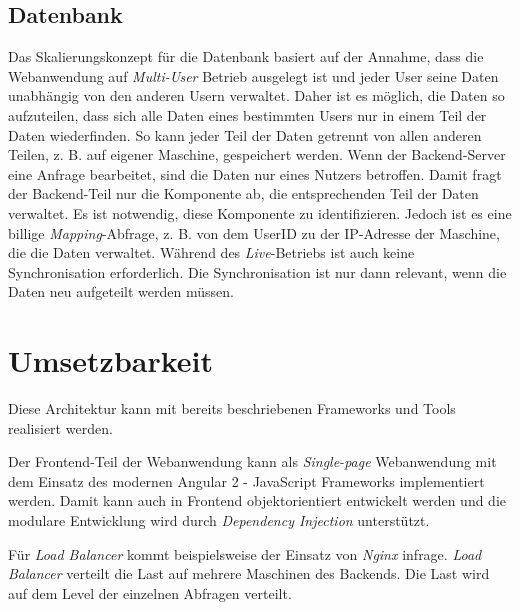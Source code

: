 \subsection{Datenbank}

Das Skalierungskonzept für die Datenbank basiert auf der Annahme, dass die Webanwendung auf \textit{Multi-User} Betrieb ausgelegt ist und jeder User seine Daten unabhängig von den anderen Usern verwaltet. Daher ist es möglich, die Daten so aufzuteilen, dass sich alle Daten eines bestimmten Users nur in einem Teil der Daten wiederfinden. So kann jeder Teil der Daten getrennt von allen anderen Teilen, z. B. auf eigener Maschine, gespeichert werden. Wenn der Backend-Server eine Anfrage bearbeitet, sind die Daten nur eines Nutzers betroffen. Damit fragt der Backend-Teil nur die Komponente ab, die entsprechenden Teil der Daten verwaltet. Es ist notwendig, diese Komponente zu identifizieren. Jedoch ist es eine billige \textit{Mapping}-Abfrage, z. B. von dem UserID zu der IP-Adresse der Maschine, die die Daten verwaltet. Während des \textit{Live}-Betriebs ist auch keine Synchronisation erforderlich. Die Synchronisation ist nur dann relevant, wenn die Daten neu aufgeteilt werden müssen.

\section{Umsetzbarkeit}
Diese Architektur kann mit bereits beschriebenen Frameworks und Tools realisiert werden.

Der Frontend-Teil der Webanwendung kann als \textit{Single-page} Webanwendung mit dem Einsatz des modernen Angular 2 - JavaScript Frameworks implementiert werden. Damit kann auch in Frontend objektorientiert entwickelt werden und die modulare Entwicklung wird durch \textit{Dependency Injection} unterstützt. 

Für \textit{Load Balancer} kommt beispielsweise der Einsatz von \textit{Nginx} \cite{nginx} infrage. \textit{Load Balancer} verteilt die Last auf mehrere Maschinen des Backends. Die Last wird auf dem Level der einzelnen Abfragen verteilt. 

